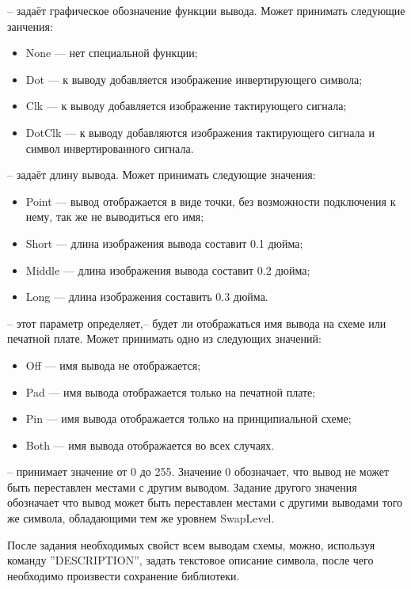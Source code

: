  -- задаёт графическое обозначение функции вывода. Может принимать
следующие занчения:
\begin{itemize}
	\item{} None --- нет специальной функции;
	\item{} Dot --- к выводу добавляется изображение инвертирующего символа;
	\item{} Clk --- к выводу добавляется изображение тактирующего сигнала;
	\item{} DotClk --- к выводу добавляются изображения тактирующего сигнала и символ
		инвертированного сигнала.
\end{itemize}


 -- задаёт длину вывода. Может принимать следующие значения:
\begin{itemize}
	\item{} Point --- вывод отображается в виде точки, без возможности подключения
		к нему, так же не выводиться его имя;
	\item{} Short  --- длина изображения вывода составит 0.1 дюйма;
	\item{} Middle  --- длина изображения вывода составит 0.2 дюйма;
	\item{} Long --- длина изображения составить 0.3 дюйма.
\end{itemize}

 -- этот параметр определяет,-- будет ли отображаться имя вывода на схеме
или печатной плате. Может принимать одно из следующих значений:
\begin{itemize}
	\item{} Off  --- имя вывода не отображается;
	\item{} Pad  --- имя вывода отображается только на печатной плате;
	\item{} Pin --- имя вывода отображается только на принципиальной схеме;
	\item{} Both --- имя вывода отображается во всех случаях.
\end{itemize}

 -- принимает значение от 0 до 255. Значение 0 обозначает, что вывод не может быть
переставлен местами с другим выводом. Задание другого значения обозначает что вывод может
быть переставлен местами с другими выводами того же символа, обладающими тем же уровнем
SwapLevel.

После задания необходимых свойст всем выводам схемы, можно, используя команду
''DESCRIPTION'', задать текстовое описание символа, после чего необходимо произвести сохранение
библиотеки.

